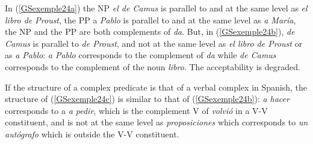 \documentclass[output=paper
                ,modfonts
                ,nonflat
	        ,collection
	        ,collectionchapter
	        ,collectiontoclongg
 	        ,biblatex
                ,babelshorthands
                ,newtxmath
                ,draftmode
                ,colorlinks, citecolor=brown
]{./langsci/langscibook}
\begin{document}
{\eal
	\label{GSexemple24} 
	\label{GSexemple24a}
	
	\label{GSexemple24b}
	
	\label{GSexemple24c}
\zl

In (\ref{GSexemple24a}) the NP \emph{el de Camus} is parallel to and at the same level as \emph{el libro de Proust}, the PP a \emph{Pablo} is parallel to and at the same level as \emph{a Mar\'ia}, the NP and the PP are both complements of \emph{da}. But, in (\ref{GSexemple24b}), \emph{de Camus} is parallel to \emph{de Proust}, and not at the same level as \emph{el libro de Proust} or as \emph{a Pablo}: \emph{a Pablo} corresponds to the complement of \emph{da} while \emph{de Camus} corresponds to the complement of the noun \emph{libro}. The acceptability is degraded. 

If the structure of a complex predicate is that of a verbal complex in Spanish, the structure of (\ref{GSexemple24c}) is similar to that of (\ref{GSexemple24b}): \emph{a hacer} corresponds to a \emph{a pedir}, which is the complement V of \emph{volvi\'o} in a V-V constituent, and is not at the same level as \emph{proposiciones} which corresponds to \emph{un aut\'ografo} which is outside the V-V constituent.   

}
\end{document}

